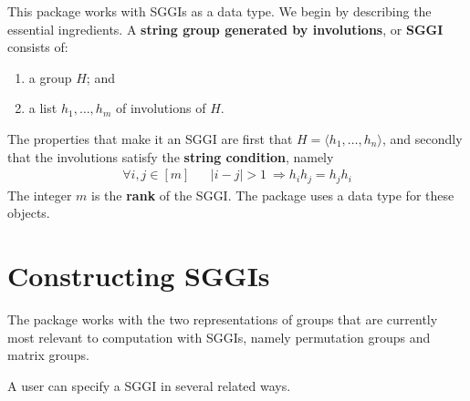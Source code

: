 \documentclass{documentation}
\begin{document}
This package works with SGGIs as a data type. We begin by describing the essential ingredients.
A {\bf string group generated by involutions}, or {\bf SGGI} consists of: 
  \begin{enumerate}
  \item a group $H$; and 
  \item a list $h_1,\ldots,h_m$ of involutions of $H$.
  \end{enumerate}
The properties that make it an SGGI are first that $H=\langle h_1,\ldots,h_n\rangle$, and 
secondly that the involutions satisfy the {\bf string condition}, namely 
\begin{align}
\label{eq:string}
\forall i,j\in[m] && |i-j|>1~\Longrightarrow
h_ih_j=h_jh_i
\end{align}
The integer $m$ is the {\bf rank} of the SGGI. The package uses a data type {\color{blue}{\tt SGGI}} for these objects. 


\section{Constructing SGGIs}
\label{sec:construct}
The package works with the two representations of groups that are currently most relevant to computation with SGGIs, namely 
permutation groups and matrix groups.
\medskip

A user can specify a SGGI in several related ways.
\end{document}
